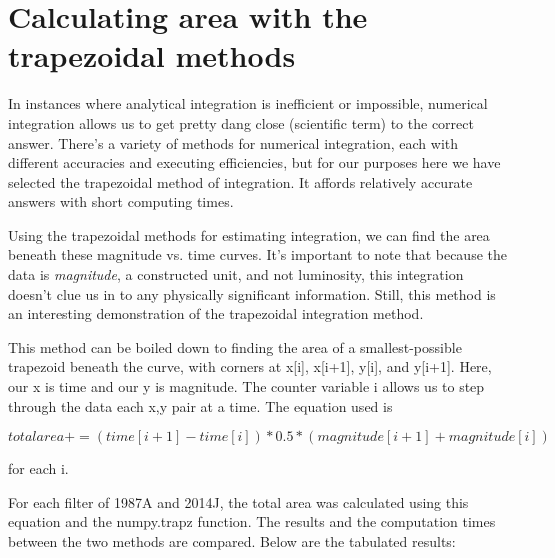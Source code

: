 \section{Calculating area with the trapezoidal methods}

In instances where analytical integration is inefficient or impossible, numerical integration allows us to get pretty dang close (scientific term) to the correct answer. There's a variety of methods for numerical integration, each with different accuracies and executing efficiencies, but for our purposes here we have selected the trapezoidal method of integration. It affords relatively accurate answers with short computing times.

Using the trapezoidal methods for estimating integration, we can find the area beneath these magnitude vs. time curves. It's important to note that because the data is \textit{magnitude}, a constructed unit, and not luminosity, this integration doesn't clue us in to any physically significant information. Still, this method is an interesting demonstration of the trapezoidal integration method.

This method can be boiled down to finding the area of a smallest-possible trapezoid beneath the curve, with corners at x[i], x[i+1], y[i], and y[i+1]. Here, our x is time and our y is magnitude. The counter variable i allows us to step through the data each x,y pair at a time. The equation used is 

\begin{equation}
	\label{fit_eq}
	total area += (time[i+1] - time[i])*0.5*(magnitude[i+1]+magnitude[i])
\end{equation}

for each i.

For each filter of 1987A and 2014J, the total area was calculated using this equation and the numpy.trapz function. The results and the computation times between the two methods are compared. Below are the tabulated results:

